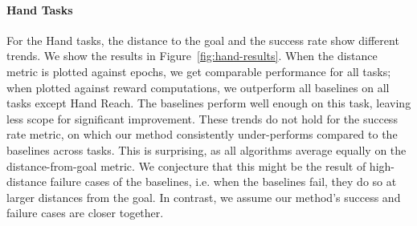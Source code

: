 \paragraph{Hand Tasks}

For the Hand tasks, the distance to the goal and the success rate show different trends.
We show the results in Figure~\ref{fig:hand-results}.
When the distance metric is plotted against epochs, we get comparable
performance for all tasks; when plotted against reward computations, we outperform
all baselines on all tasks except Hand Reach. The baselines perform
well enough on this task, leaving less scope for significant improvement.
These trends do not hold for the success rate metric, on which our method
consistently under-performs compared to the baselines across tasks. This
is surprising, as all algorithms average equally on the distance-from-goal metric.
We conjecture that this might be the result of
high-distance failure cases of the baselines, i.e. when the baselines
fail, they do so at larger distances from the goal. In contrast, we
assume our method's success and failure cases are closer together. 

